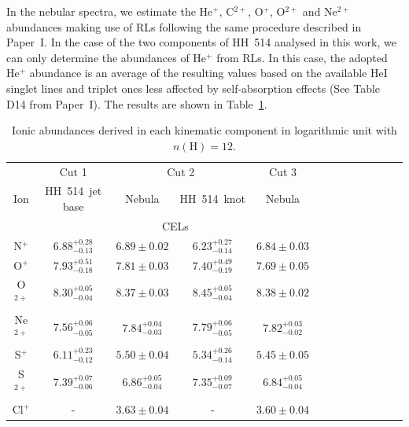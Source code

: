 \documentclass[fleqn,usenatbib]{mnras}
\begin{document}

In the nebular spectra, we estimate the He$^{+}$, C$^{2+}$, O$^{+}$, O$^{2+}$ and Ne$^{2+}$ abundances making use of RLs following the same procedure described in Paper~I. In the case of the two components of HH~514 analysed in this work, we can  only determine the abundances of He$^{+}$ from RLs. In this case, the adopted He$^{+}$ abundance is an average of the resulting values based on the available He\thinspace I singlet lines and triplet ones less affected by self-absorption effects (See Table D14 from Paper~I). The results are shown in Table~\ref{tab:ionic_abundances}. 

\begin{table}
\centering
\caption{Ionic abundances derived in each kinematic component in logarithmic unit with $n(\text{H})=12$.}
\label{tab:ionic_abundances}
\begin{tabular}{ccccccccccccc}
\hline
 & \multicolumn{1}{c}{Cut 1} & \multicolumn{2}{c}{Cut 2} & \multicolumn{1}{c}{Cut 3} & \\
Ion &  HH~514~jet base & Nebula & HH~514~knot  & Nebula \\
\hline
 & \multicolumn{4}{c}{CELs}\\

N$^{+}$  & $6.88^{+0.28} _{-0.13}$ &$6.89 \pm 0.02 $  & $6.23^{+0.27} _{-0.14}$& $6.84 \pm 0.03 $\\

O$^{+}$ & $7.93^{+0.51} _{-0.18}$ & $7.81 \pm 0.03 $&$7.40^{+0.49} _{-0.19}$ & $7.69 \pm 0.05 $\\ 

O$^{2+}$ & $8.30^{+0.05} _{-0.04}$& $8.37 \pm 0.03$& $8.45^{+0.05} _{-0.04}$ &$8.38 \pm 0.02 $\\

Ne$^{2+}$ & $7.56^{+0.06} _{-0.05}$& $7.84^{+0.04} _{-0.03}$ & $7.79^{+0.06} _{-0.05}$&$7.82^{+0.03} _{-0.02}$\\

S$^{+}$ & $6.11^{+0.23} _{-0.12}$ & $5.50 \pm 0.04 $& $5.34^{+0.26} _{-0.14}$&$5.45 \pm 0.05 $\\

S$^{2+}$ & $7.39^{+0.07} _{-0.06}$ &$6.86^{+0.05} _{-0.04}$ & $7.35^{+0.09} _{-0.07}$&$6.84^{+0.05} _{-0.04}$\\

Cl$^{+}$ & - &$3.63 \pm 0.04 $&- &$3.60 \pm 0.04 $\\


\end{tabular}
\end{table}
\end{document}
